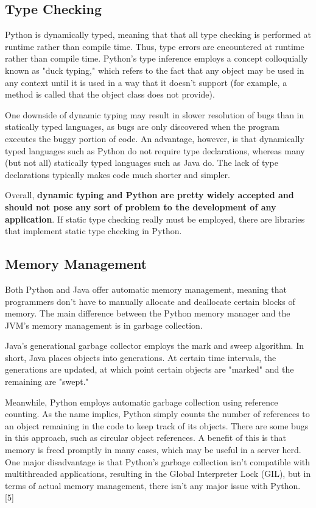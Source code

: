 \subsection{Type Checking}
Python is dynamically typed, meaning that that all type checking is performed at runtime rather than compile time. Thus, type errors are encountered at runtime rather than compile time. 
Python's type inference employs a concept colloquially known as "duck typing," which refers to the fact that any object may be used in any context until it is used in a way that it 
doesn't support (for example, a method is called that the object class does not provide). 

One downside of dynamic typing may result in slower resolution of bugs than in statically typed languages, as bugs are only discovered when the program executes the buggy portion of code. An 
advantage, however, is that dynamically typed languages such as Python do not require type declarations, whereas many (but not all) statically typed languages such as Java do. The lack 
of type declarations typically makes code much shorter and simpler.

Overall, \textbf{dynamic typing and Python are pretty widely accepted and should not pose any sort of problem to the development of any application}. If static type checking really must be employed, 
there are libraries that implement static type checking in Python. 

\subsection{Memory Management}
Both Python and Java offer automatic memory management, meaning that programmers don't have to manually allocate and deallocate certain
blocks of memory. The main difference between the Python memory manager and the JVM's memory management is in garbage collection.

Java's generational garbage collector employs the mark and sweep algorithm. In short, Java places objects into generations. At certain time intervals,
the generations are updated, at which point certain objects are "marked" and the remaining are "swept." 

Meanwhile, Python employs automatic garbage collection using reference counting. As the name implies, Python simply counts the number of references 
to an object remaining in the code to keep track of its objects. There are some bugs in this approach, such as circular object references. A 
benefit of this is that memory is freed promptly in many cases, which may be useful in a server herd. One major disadvantage is that Python's garbage collection 
isn't compatible with multithreaded applications, resulting in the Global Interpreter Lock (GIL), but in terms of actual memory management, 
there isn't any major issue with Python. [5]

